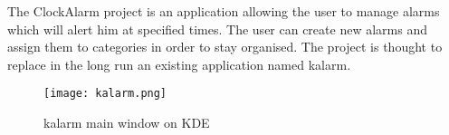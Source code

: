 The ClockAlarm project is an application allowing the user to manage alarms which will alert him at specified times. The user can create new alarms and assign them to categories in order to stay organised. The project is thought to replace in the long run an existing application named \gls{kalarm}.

\begin{figure}[h]
\centering
\caption{\gls{kalarm} main window on KDE}
\texttt{[image: kalarm.png]}
\end{figure}